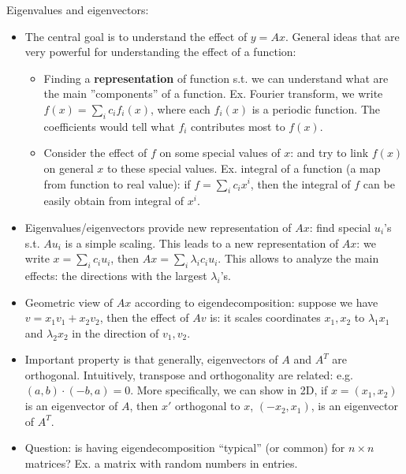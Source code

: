 \documentclass{report}
\begin{document}
Eigenvalues and eigenvectors: 
\begin{itemize}
	\item The central goal is to understand the effect of $y = Ax$. General ideas that are very powerful for understanding the effect of a function: 
	\begin{itemize}
		\item Finding a \textbf{representation} of function s.t. we can understand what are the main ''components'' of a function. Ex. Fourier transform, we write $f(x) = \sum_i c_i f_i(x)$, where each $f_i(x)$ is a periodic function. The coefficients would tell what $f_i$ contributes most to $f(x)$.  
		
		\item Consider the effect of $f$ on some special values of $x$: and try to link $f(x)$ on general $x$ to these special values. Ex. integral of a function (a map from function to real value): if $f = \sum_i c_i x^i$, then the integral of $f$ can be easily obtain from integral of $x^i$.  
	\end{itemize}
	
	\item Eigenvalues/eigenvectors provide new representation of $Ax$: find special $u_i$'s s.t. $A u_i$ is a simple scaling. This leads to a new representation of $Ax$: we write $x = \sum_i c_i u_i$, then $Ax = \sum_i \lambda_i c_i u_i$. This allows to analyze the main effects: the directions with the largest $\lambda_i$'s. 
	
	\item Geometric view of $Ax$ according to eigendecomposition: suppose we have $v = x_1 v_1 + x_2 v_2$, then the effect of $Av$ is: it scales coordinates $x_1, x_2$ to $\lambda_1 x_1$ and $\lambda_2 x_2$ in the direction of $v_1, v_2$. 
	
	\item Important property is that generally, eigenvectors of $A$ and $A^T$ are orthogonal. Intuitively, transpose and orthogonality are related: e.g. $(a,b) \cdot (-b, a) = 0$. More specifically, we can show in 2D, if $x = (x_1,x_2)$ is an eigenvector of $A$, then $x'$ orthogonal to $x$, $(-x_2,x_1)$, is an eigenvector of $A^T$.  
	
	\item Question: is having eigendecomposition ``typical'' (or common) for $n \times n$ matrices? Ex. a matrix with random numbers in entries. 
\end{itemize}
\end{document}
